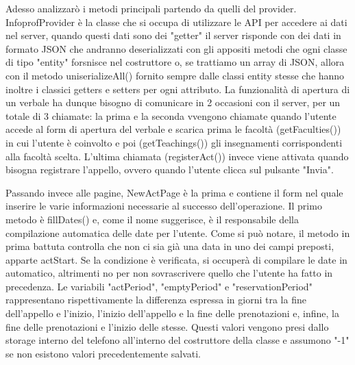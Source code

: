 \documentclass[Lau, oneside]{sapthesis}%
\begin{document}
Adesso analizzarò i metodi principali partendo da quelli del provider. InfoprofProvider è la classe che si occupa di utilizzare le API per accedere ai dati nel server, quando questi dati sono dei "getter" il server risponde con dei dati in formato JSON che andranno deserializzati con gli appositi metodi che ogni classe di tipo "entity" forsnisce nel costruttore o, se trattiamo un array di JSON, allora con il metodo uniserializeAll() fornito sempre dalle classi entity stesse che hanno inoltre i classici getters e setters per ogni attributo. La funzionalità di apertura di un verbale ha dunque bisogno di comunicare in 2 occasioni con il server, per un totale di 3 chiamate: la prima e la seconda vvengono chiamate quando l'utente accede al form di apertura del verbale e scarica prima le facoltà (getFaculties()) in cui l'utente è coinvolto e poi (getTeachings()) gli insegnamenti corrispondenti alla facoltà scelta. L'ultima chiamata (registerAct()) invece viene attivata quando bisogna registrare l'appello, ovvero quando l'utente clicca sul pulsante "Invia".

Passando invece alle pagine, NewActPage è la prima e contiene il form nel quale inserire le varie informazioni necessarie al successo dell'operazione. Il primo metodo è fillDates() e, come il nome suggerisce, è il responsabile della compilazione automatica delle date per l'utente. Come si può notare, il metodo in prima battuta controlla che non ci sia già una data in uno dei campi preposti, apparte actStart. Se la condizione è verificata, si occuperà di compilare le date in automatico, altrimenti no per non sovrascrivere quello che l'utente ha fatto in precedenza.
Le variabili "actPeriod", "emptyPeriod" e "reservationPeriod" rappresentano rispettivamente la differenza espressa in giorni tra la fine dell'appello e l'inizio, l'inizio dell'appello e la fine delle prenotazioni e, infine, la fine delle prenotazioni e l'inizio delle stesse. Questi valori vengono presi dallo storage interno del telefono all'interno del costruttore della classe e assumono "-1" se non esistono valori precedentemente salvati.
\end{document}
